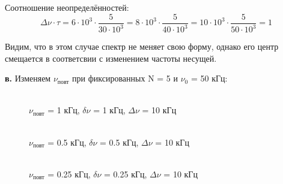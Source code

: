\documentclass[a4paper,12pt]{article}
\begin{document}
\begin{enumerate}
Соотношение неопределённостей:
\[
\Delta \nu \cdot \tau = 6\cdot10^3\cdot\frac{5}{30\cdot10^3} = 8\cdot10^3\cdot\frac{5}{40\cdot10^3} = 10\cdot10^3\cdot\frac{5}{50\cdot10^3} = 1
\]

Видим, что в этом случае спектр не меняет свою форму, однако его центр смещается в соответсвии с изменением частоты несущей.

\newpage

\textbf{в.} Изменяем $\nu_\text{повт}$ при фиксированных N = 5 и $\nu_0$ = 50 кГц:

\begin{figure}[h]
\begin{minipage}[h]{0.47\linewidth}
 \\ $\nu_\text{повт}$ = 1 кГц, $\delta \nu$ = 1 кГц, $\Delta \nu$ = 10 кГц
\end{minipage}
\hfill
\begin{minipage}[h]{0.47\linewidth}
 \\ $\nu_\text{повт}$ = 0.5 кГц, $\delta \nu$ = 0.5 кГц, $\Delta \nu$ = 10 кГц
\end{minipage}
\vfill
\begin{minipage}[h]{0.47\linewidth}
 \\ $\nu_\text{повт}$ = 0.25 кГц, $\delta \nu$ = 0.25 кГц, $\Delta \nu$ = 10 кГц

\end{minipage}
\end{figure}
\end{enumerate}
\end{document}
